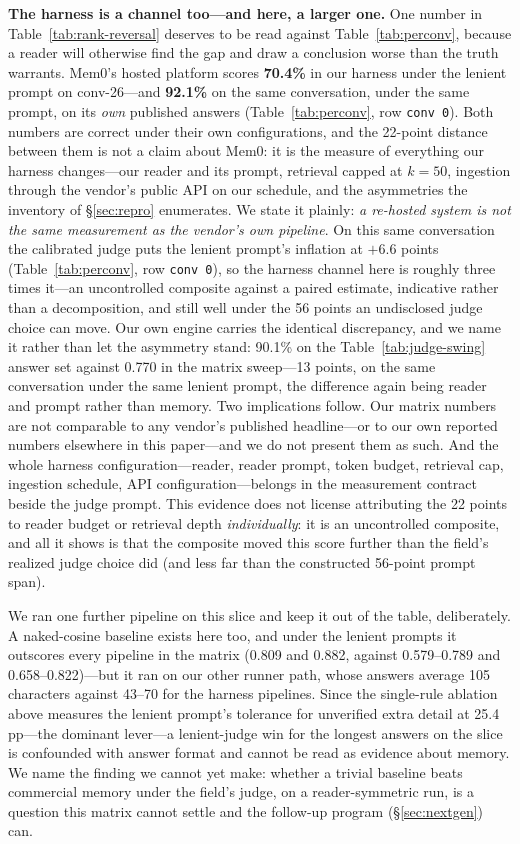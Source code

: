 \documentclass[11pt]{article}
\begin{document}
\textbf{The harness is a channel too---and here, a larger one.} One number in Table~\ref{tab:rank-reversal} deserves to be read against Table~\ref{tab:perconv}, because a reader will otherwise find the gap and draw a conclusion worse than the truth warrants. Mem0's hosted platform scores \textbf{70.4\%} in our harness under the lenient prompt on conv-26---and \textbf{92.1\%} on the same conversation, under the same prompt, on its \emph{own} published answers (Table~\ref{tab:perconv}, row \texttt{conv 0}). Both numbers are correct under their own configurations, and the 22-point distance between them is not a claim about Mem0: it is the measure of everything our harness changes---our reader and its prompt, retrieval capped at $k=50$, ingestion through the vendor's public API on our schedule, and the asymmetries the inventory of \S\ref{sec:repro} enumerates. We state it plainly: \emph{a re-hosted system is not the same measurement as the vendor's own pipeline}. On this same conversation the calibrated judge puts the lenient prompt's inflation at $+6.6$ points (Table~\ref{tab:perconv}, row \texttt{conv 0}), so the harness channel here is roughly three times it---an uncontrolled composite against a paired estimate, indicative rather than a decomposition, and still well under the 56 points an undisclosed judge choice can move. Our own engine carries the identical discrepancy, and we name it rather than let the asymmetry stand: 90.1\% on the Table~\ref{tab:judge-swing} answer set against 0.770 in the matrix sweep---13 points, on the same conversation under the same lenient prompt, the difference again being reader and prompt rather than memory. Two implications follow. Our matrix numbers are not comparable to any vendor's published headline---or to our own reported numbers elsewhere in this paper---and we do not present them as such. And the whole harness configuration---reader, reader prompt, token budget, retrieval cap, ingestion schedule, API configuration---belongs in the measurement contract beside the judge prompt. This evidence does not license attributing the 22 points to reader budget or retrieval depth \emph{individually}: it is an uncontrolled composite, and all it shows is that the composite moved this score further than the field's realized judge choice did (and less far than the constructed 56-point prompt span).

We ran one further pipeline on this slice and keep it out of the table, deliberately. A naked-cosine baseline exists here too, and under the lenient prompts it outscores every pipeline in the matrix (0.809 and 0.882, against 0.579--0.789 and 0.658--0.822)---but it ran on our other runner path, whose answers average 105 characters against 43--70 for the harness pipelines. Since the single-rule ablation above measures the lenient prompt's tolerance for unverified extra detail at 25.4\,pp---the dominant lever---a lenient-judge win for the longest answers on the slice is confounded with answer format and cannot be read as evidence about memory. We name the finding we cannot yet make: whether a trivial baseline beats commercial memory under the field's judge, on a reader-symmetric run, is a question this matrix cannot settle and the follow-up program (\S\ref{sec:nextgen}) can.
\end{document}
